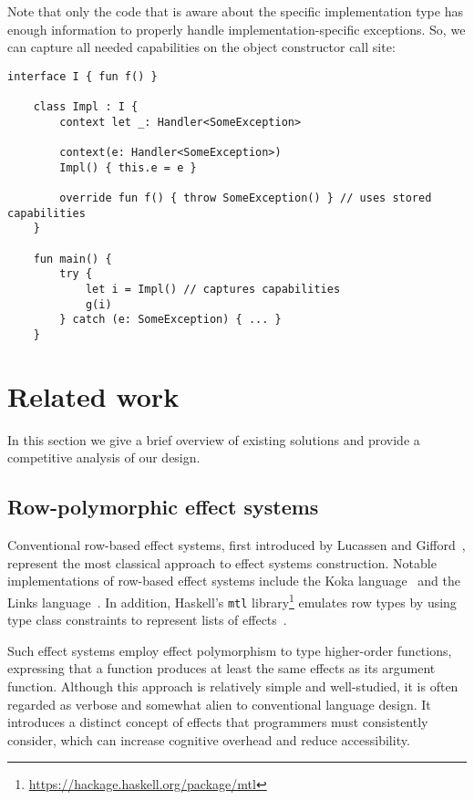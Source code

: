 \documentclass[acmsmall,review,screen]{acmart}
\begin{document}
Note that only the code that is aware about the specific implementation type has enough information to properly handle implementation-specific exceptions.
So, we can capture all needed capabilities on the object constructor call site:
\begin{lstlisting}[language=colang]
    interface I { fun f() }

    class Impl : I {
        context let _: Handler<SomeException>

        context(e: Handler<SomeException>)
        Impl() { this.e = e }

        override fun f() { throw SomeException() } // uses stored capabilities
    }

    fun main() {
        try {
            let i = Impl() // captures capabilities
            g(i)
        } catch (e: SomeException) { ... }
    }
\end{lstlisting}


\section{Related work} \label{sec:related}

In this section we give a brief overview of existing solutions and provide a competitive analysis of our design.

\subsection{Row-polymorphic effect systems} \label{subsec:overview-rows}

Conventional row-based effect systems, first introduced by Lucassen and Gifford~\cite{lucassen1988polymorphic}, represent the most classical approach to effect systems construction.
Notable implementations of row-based effect systems include the Koka language~\cite{leijen2014koka, leijen2017type} and the Links language~\cite{hillerstrom2016liberating}.
In addition, Haskell's \texttt{mtl} library\footnote{\url{https://hackage.haskell.org/package/mtl}} emulates row types by using type class constraints to represent lists of effects~\cite{jones1995functional}.

Such effect systems employ effect polymorphism to type higher-order functions, expressing that a function produces at least the same effects as its argument function.
Although this approach is relatively simple and well-studied, it is often regarded as verbose and somewhat alien to conventional language design.
It introduces a distinct concept of effects that programmers must consistently consider, which can increase cognitive overhead and reduce accessibility.
\end{document}
